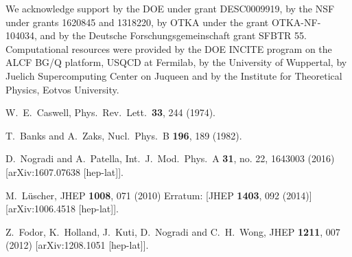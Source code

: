 \documentclass[epj]{webofc}
\begin{document}
We acknowledge support by the DOE under grant DESC0009919,
by the NSF under grants 1620845 and
1318220, by OTKA under the grant OTKA-NF-104034,
and by the Deutsche Forschungsgemeinschaft grant SFBTR
55. Computational resources
were provided by the DOE INCITE program on the
ALCF BG/Q platform, USQCD at Fermilab, by the University
of Wuppertal, by Juelich Supercomputing Center on Juqueen
and by the Institute for Theoretical 
Physics, Eotvos University.

\begin{thebibliography}{99}

\footnotesize

  W.~E.~Caswell,
  Phys.\ Rev.\ Lett.\  {\bf 33}, 244 (1974).



  T.~Banks and A.~Zaks,
  Nucl.\ Phys.\ B {\bf 196}, 189 (1982).



  D.~Nogradi and A.~Patella,
  Int.\ J.\ Mod.\ Phys.\ A {\bf 31}, no. 22, 1643003 (2016)
  [arXiv:1607.07638 [hep-lat]].



  M.~Lüscher,
  JHEP {\bf 1008}, 071 (2010)
  Erratum: [JHEP {\bf 1403}, 092 (2014)]
  [arXiv:1006.4518 [hep-lat]].



  Z.~Fodor, K.~Holland, J.~Kuti, D.~Nogradi and C.~H.~Wong,
  JHEP {\bf 1211}, 007 (2012)
  [arXiv:1208.1051 [hep-lat]].




\end{thebibliography}
\end{document}
